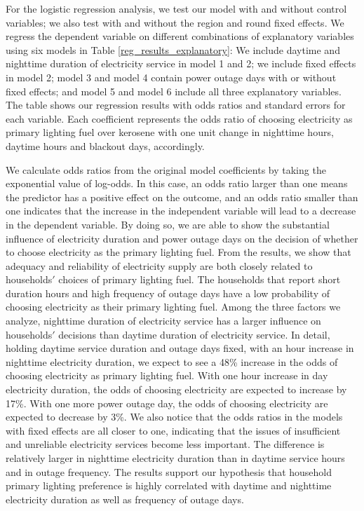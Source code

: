\documentclass[11pt,english]{article}
\theoremstyle{plain} \newtheorem{claim}{Claim}
\theoremstyle{plain} \newtheorem{prop}{Proposition}
\theoremstyle{plain} \newtheorem{hypo}{Hypothesis}
\begin{document}
For the logistic regression analysis, we test our model with and without control variables; we also test with and without the region and round fixed effects. We regress the dependent variable on different combinations of explanatory variables using six models in Table \ref{reg_results_explanatory}: We include daytime and nighttime duration of electricity service in model 1 and 2; we include fixed effects in model 2; model 3 and model 4 contain power outage days with or without fixed effects; and model 5 and model 6 include all three explanatory variables. The table shows our regression results with odds ratios and standard errors for each variable. Each coefficient represents the odds ratio of choosing electricity as primary lighting fuel over kerosene with one unit change in nighttime hours, daytime hours and blackout days, accordingly.

We calculate odds ratios from the original model coefficients by taking the exponential value of log-odds. In this case, an odds ratio larger than one means the predictor has a positive effect on the outcome, and an odds ratio smaller than one indicates that the increase in the independent variable will lead to a decrease in the dependent variable. By doing so, we are able to show the substantial influence of electricity duration and power outage days on the decision of whether to choose electricity as the primary lighting fuel. From the results, we show that adequacy and reliability of electricity supply are both closely related to households$'$ choices of primary lighting fuel. The households that report short duration hours and high frequency of outage days have a low probability of choosing electricity as their primary lighting fuel. Among the three factors we analyze, nighttime duration of electricity service has a larger influence on households$'$ decisions than daytime duration of electricity service. In detail, holding daytime service duration and outage days fixed, with an hour increase in nighttime electricity duration, we expect to see a 48\% increase in the odds of choosing electricity as primary lighting fuel. With one hour increase in day electricity duration, the odds of choosing electricity are expected to increase by 17\%. With one more power outage day, the odds of choosing electricity are expected to decrease by 3\%. We also notice that the odds ratios in the models with fixed effects are all closer to one, indicating that the issues of insufficient and unreliable electricity services become less important. The difference is relatively larger in nighttime electricity duration than in daytime service hours and in outage frequency. The results support our hypothesis that household primary lighting preference is highly correlated with daytime and nighttime electricity duration as well as frequency of outage days.
\end{document}
